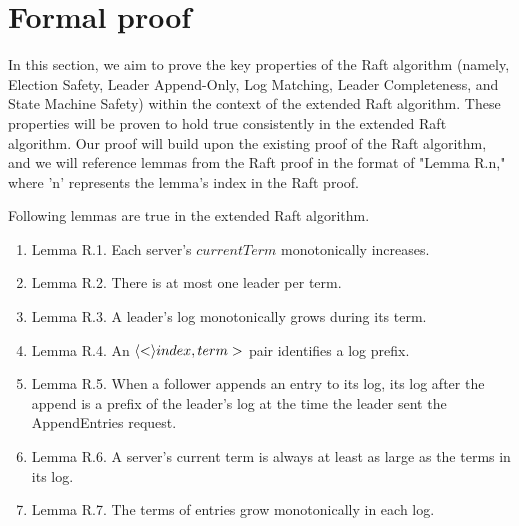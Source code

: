 \section{Formal proof}\label{section:proof}

In this section, we aim to prove the key properties of the Raft algorithm (namely, Election Safety, Leader Append-Only, Log Matching, Leader Completeness, and State Machine Safety) within the context of the extended Raft algorithm. These properties will be proven to hold true consistently in the extended Raft algorithm. Our proof will build upon the existing proof of the Raft algorithm, and we will reference lemmas from the Raft proof in the format of "Lemma R.n," where 'n' represents the lemma's index in the Raft proof.

\begin{lemma}
	Following lemmas are true in the extended Raft algorithm.
	\begin{enumerate}
		\item Lemma R.1. Each server's $currentTerm$ monotonically increases.
		\item Lemma R.2. There is at most one leader per term.
		\item Lemma R.3. A leader's log monotonically grows during its term.
		\item Lemma R.4. An $\langle < \rangle index,term>$ pair identifies a log prefix.
		\item Lemma R.5. When a follower appends an entry to its log, its log after the append is a prefix of the leader's log at the time the leader sent the AppendEntries request.
		\item Lemma R.6. A server's current term is always at least as large as the terms in its log.
		\item Lemma R.7. The terms of entries grow monotonically in each log.
	\end{enumerate}
\end{lemma}
